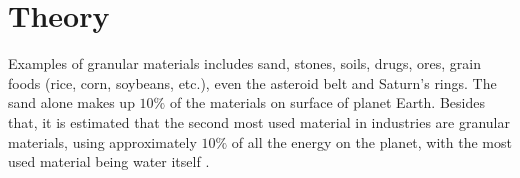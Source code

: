
\section{Theory}
\label{subsection:Teoria}


    Examples of granular materials includes sand, stones, soils, drugs, ores, grain foods (rice, corn, soybeans, etc.), even the asteroid belt and Saturn's rings. The sand alone makes up $10\%$ of the materials on surface of planet Earth. Besides that, it is estimated that the second most used material in industries are granular materials, using approximately $10\%$ of all the energy on the planet, with the most used material being water itself \cite{Sands_Powders_and_Grains}.

